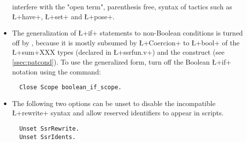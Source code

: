 \begin{itemize}
interfere with the "open term", parenthesis free, syntax of tactics
such as \L+have+, \L+set+ and \L+pose+.
\item The generalization of \L+if+ statements to non-Boolean
conditions is turned off by \ssr{}, because it is mostly subsumed by
\L+Coercion+ to \L+bool+ of the \L+sum+XXX types (declared in
\L+ssrfun.v+)
 and the  construct (see
\ref{ssec:patcond}). To use the generalized form, turn off the \ssr{}
Boolean \L+if+ notation using the command:
\begin{lstlisting}
  Close Scope boolean_if_scope.
\end{lstlisting}
\item The following two options can be unset to disable the
      incompatible \L+rewrite+ syntax and allow
      reserved identifiers to appear in scripts.
\begin{lstlisting}
  Unset SsrRewrite.
  Unset SsrIdents.
\end{lstlisting}
\end{itemize}
